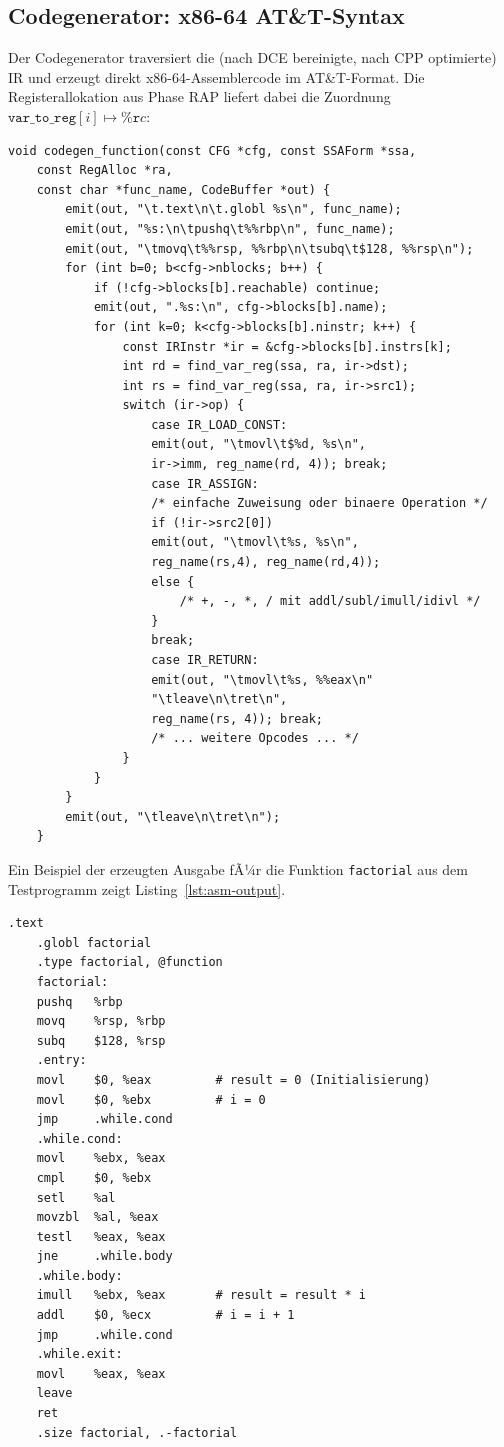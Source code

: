 ﻿\documentclass[a4paper,12pt]{article}
\theoremstyle{definition}
\begin{document}
\subsection{Codegenerator: x86-64 AT\&T-Syntax}
\label{sec:impl-codegen}

Der Codegenerator traversiert die (nach DCE bereinigte, nach CPP
optimierte) IR und erzeugt direkt x86-64-Assemblercode im AT\&T-Format.
Die Registerallokation aus Phase RAP liefert dabei die Zuordnung
$\texttt{var\_to\_reg}[i] \mapsto \mathtt{\%r}c$:

\begin{lstlisting}[style=cstyle, caption={Codegenerierung -- IR zu x86-64
		(compiler\_full.c)}, label=lst:codegen]
	void codegen_function(const CFG *cfg, const SSAForm *ssa,
	const RegAlloc *ra,
	const char *func_name, CodeBuffer *out) {
		emit(out, "\t.text\n\t.globl %s\n", func_name);
		emit(out, "%s:\n\tpushq\t%%rbp\n", func_name);
		emit(out, "\tmovq\t%%rsp, %%rbp\n\tsubq\t$128, %%rsp\n");
		for (int b=0; b<cfg->nblocks; b++) {
			if (!cfg->blocks[b].reachable) continue;
			emit(out, ".%s:\n", cfg->blocks[b].name);
			for (int k=0; k<cfg->blocks[b].ninstr; k++) {
				const IRInstr *ir = &cfg->blocks[b].instrs[k];
				int rd = find_var_reg(ssa, ra, ir->dst);
				int rs = find_var_reg(ssa, ra, ir->src1);
				switch (ir->op) {
					case IR_LOAD_CONST:
					emit(out, "\tmovl\t$%d, %s\n",
					ir->imm, reg_name(rd, 4)); break;
					case IR_ASSIGN:
					/* einfache Zuweisung oder binaere Operation */
					if (!ir->src2[0])
					emit(out, "\tmovl\t%s, %s\n",
					reg_name(rs,4), reg_name(rd,4));
					else {
						/* +, -, *, / mit addl/subl/imull/idivl */
					}
					break;
					case IR_RETURN:
					emit(out, "\tmovl\t%s, %%eax\n"
					"\tleave\n\tret\n",
					reg_name(rs, 4)); break;
					/* ... weitere Opcodes ... */
				}
			}
		}
		emit(out, "\tleave\n\tret\n");
	}
\end{lstlisting}

Ein Beispiel der erzeugten Ausgabe fÃ¼r die Funktion \texttt{factorial}
aus dem Testprogramm zeigt Listing~\ref{lst:asm-output}.

\begin{lstlisting}[language={[x86masm]Assembler},
	caption={Erzeugter x86-64-Assemblercode fÃ¼r \texttt{factorial}},
	label=lst:asm-output]
	.text
	.globl factorial
	.type factorial, @function
	factorial:
	pushq   %rbp
	movq    %rsp, %rbp
	subq    $128, %rsp
	.entry:
	movl    $0, %eax         # result = 0 (Initialisierung)
	movl    $0, %ebx         # i = 0
	jmp     .while.cond
	.while.cond:
	movl    %ebx, %eax
	cmpl    $0, %ebx
	setl    %al
	movzbl  %al, %eax
	testl   %eax, %eax
	jne     .while.body
	.while.body:
	imull   %ebx, %eax       # result = result * i
	addl    $0, %ecx         # i = i + 1
	jmp     .while.cond
	.while.exit:
	movl    %eax, %eax
	leave
	ret
	.size factorial, .-factorial
\end{lstlisting}
\end{document}

